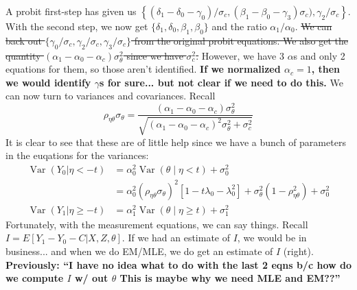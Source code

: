 \documentclass[11pt,letterpaper]{article}
\DeclareMathOperator{\Var}{Var}
\begin{document}
A probit first-step has given us $\left\{ (\delta_1 - \delta_0 -\gamma_0)/\sigma_c, (\beta_1 - \beta_0 - \gamma_3)\sigma_c), \gamma_2/\sigma_c \right\}$. With the second step, we now get $\{\delta_1, \delta_0, \beta_1, \beta_0\}$ and the ratio $\alpha_1/\alpha_0$. \sout{We can back out $\{\gamma_0/\sigma_c, \gamma_2/\sigma_c, \gamma_3/\sigma_c\}$ from the original probit equations. We also get the quantity $(\alpha_1 - \alpha_0 - \alpha_c)\sigma^2_\theta$ since we have $\sigma_c^2$.} However, we have 3 $\alpha$s and only 2 equations for them, so those aren't identified. \textbf{If we normalized $\alpha_c = 1$, then we would identify $\gamma$s for sure... but not clear if we need to do this.} We can now turn to variances and covariances. Recall
\[
\rho_{\eta\theta}\sigma_\theta = \frac{(\alpha_1 - \alpha_0 - \alpha_c)\sigma^2_\theta}{\sqrt{(\alpha_1 - \alpha_0 - \alpha_c)^2\sigma^2_\theta + \sigma^2_c}}
\]
It is clear to see that these are of little help since we have a bunch of parameters in the euqations for the variances: 
\begin{align*}
\Var (Y_0| \eta  <  -t ) 
	&= \alpha_0^2 \Var\left(\theta\middle| \eta <    t\right) + \sigma^2_0  \\
	&= \alpha_0^2 \left( \rho_{\eta\theta}\sigma_\theta \right)^2 \left[1 - t \lambda_0 - \lambda_0^2 \right] + \sigma^2_\theta \left( 1- \rho_{\eta\theta}^2\right) + \sigma^2_0\\
\Var (Y_1| \eta\geq -t ) &= \alpha_1^2 \Var\left(\theta\middle| \eta \geq t\right) + \sigma^2_1 
\end{align*}
Fortunately, with the measurement equations, we can say things. Recall $I=E[Y_1 - Y_0 - C|X,Z,\theta]$. If we had an estimate of $I$, we would be in business... and when we do EM/MLE, we do get an estimate of $I$ (right). \textbf{Previously: ``I have no idea what to do with the last 2 eqns b/c how do we compute $I$ w/ out $\theta$ This is maybe why we need MLE and EM??''}
\end{document}
